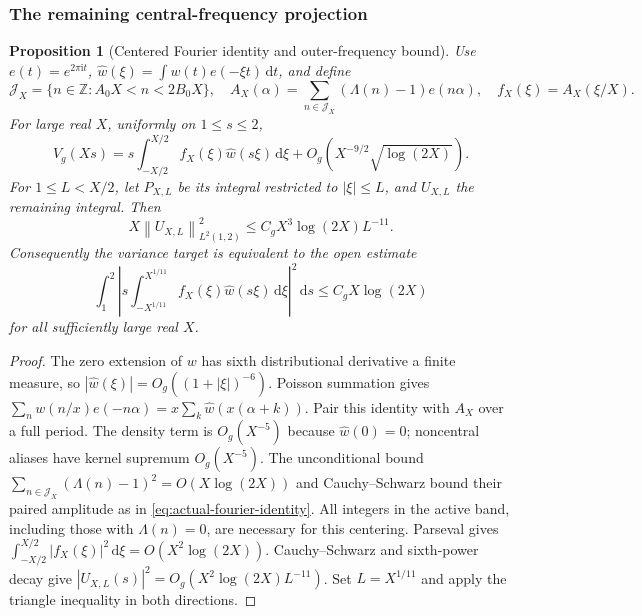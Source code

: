 \documentclass[11pt]{article}
\numberwithin{equation}{section}
\newtheorem{proposition}[theorem]{Proposition}
\theoremstyle{definition}
\theoremstyle{remark}
\newcommand{\ii}{\mathrm i}
\newcommand{\norm}[1]{\left\lVert #1\right\rVert}
\newcommand{\dd}{\,\mathrm d}
\begin{document}
\subsubsection{The remaining central-frequency projection}

\begin{proposition}[Centered Fourier identity and outer-frequency bound]
\label{prop:actual-central-projection}
Use \(e(t)=e^{2\pi\ii t}\),
\(\widehat w(\xi)=\int w(t)e(-\xi t)\dd t\), and define
\begin{equation}\label{eq:actual-centered-sum}
\mathcal J_X=\{n\in\mathbb Z:A_0X<n<2B_0X\},\quad
A_X(\alpha)=\sum_{n\in\mathcal J_X}(\Lambda(n)-1)e(n\alpha),
\quad f_X(\xi)=A_X(\xi/X).
\end{equation}
For large real \(X\), uniformly on \(1\le s\le2\),
\begin{equation}\label{eq:actual-fourier-identity}
V_g(Xs)=s\int_{-X/2}^{X/2}f_X(\xi)\widehat w(s\xi)\dd\xi
+O_g(X^{-9/2}\sqrt{\log(2X)}).
\end{equation}
For \(1\le L<X/2\), let \(P_{X,L}\) be its integral restricted to
\(|\xi|\le L\), and \(U_{X,L}\) the remaining integral. Then
\begin{equation}\label{eq:actual-outer-bound}
X\norm{U_{X,L}}_{L^2(1,2)}^2\le C_gX^3\log(2X)L^{-11}.
\end{equation}
Consequently the variance target is equivalent to the open estimate
\begin{equation}\label{eq:actual-central-target}
\int_1^2\left|s\int_{-X^{1/11}}^{X^{1/11}}
 f_X(\xi)\widehat w(s\xi)\dd\xi\right|^2\dd s
\le C_gX\log(2X)
\end{equation}
for all sufficiently large real \(X\).
\end{proposition}
\begin{proof}
The zero extension of \(w\) has sixth distributional derivative a finite
measure, so \(|\widehat w(\xi)|=O_g((1+|\xi|)^{-6})\).
Poisson summation gives
\(\sum_nw(n/x)e(-n\alpha)=x\sum_k\widehat w(x(\alpha+k))\).
Pair this identity with \(A_X\) over a full period. The density term is
\(O_g(X^{-5})\) because \(\widehat w(0)=0\); noncentral aliases have
kernel supremum \(O_g(X^{-5})\). The unconditional bound
\(\sum_{n\in\mathcal J_X}(\Lambda(n)-1)^2=O(X\log(2X))\)
and Cauchy--Schwarz bound their paired amplitude as in
\eqref{eq:actual-fourier-identity}. All integers in the active band,
including those with \(\Lambda(n)=0\), are necessary for this centering.
Parseval gives
\(\int_{-X/2}^{X/2}|f_X(\xi)|^2\dd\xi=O(X^2\log(2X))\).
Cauchy--Schwarz and sixth-power decay give
\(|U_{X,L}(s)|^2=O_g(X^2\log(2X)L^{-11})\).
Set \(L=X^{1/11}\) and apply the triangle inequality in both directions.
\end{proof}
\end{document}
